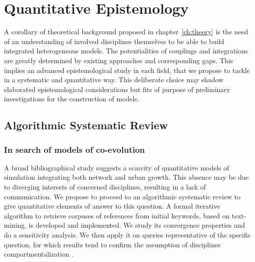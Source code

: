 





\chapter{Quantitative Epistemology} %

\label{ch:quantepistemo} %





A corollary of theoretical background proposed in chapter~\ref{ch:theory} is the need of an understanding of involved disciplines themselves to be able to build integrated heterogeneous models. The potentialities of couplings and integrations are greatly determined by existing approaches and corresponding gaps. This implies an advanced epistemological study in each field, that we propose to tackle in a systematic and quantitative way. This deliberate choice may shadow elaborated epistemological considerations but fits of purpose of preliminary investigations for the construction of models. 







\section{Algorithmic Systematic Review}


\subsection{In search of models of co-evolution}


A broad bibliographical study suggests a scarcity of quantitative models of simulation integrating both network and urban growth. This absence may be due to diverging interests of concerned disciplines, resulting in a lack of communication.  We propose to proceed to an algorithmic systematic review to give quantitative elements of answer to this question. A formal iterative algorithm to retrieve corpuses of references from initial keywords, based on text-mining, is developed and implemented. We study its convergence properties and do a sensitivity analysis. We then apply it on queries representative of the specific question, for which results tend to confirm the assumption of disciplines compartmentalization .

